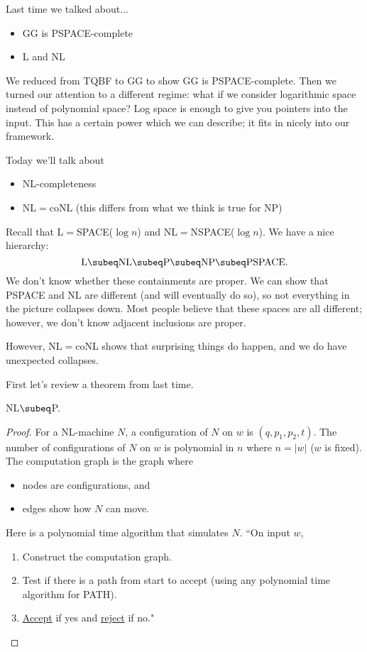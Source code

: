 
Last time we talked about...
\begin{itemize}
\item
GG is PSPACE-complete
\item
L and NL
\end{itemize}
We reduced from TQBF to GG to show GG is PSPACE-complete. Then we turned our attention to a different regime: what if we consider logarithmic space instead of polynomial space? Log space is enough to give you pointers into the input. This has a certain power which we can describe; it fits in nicely into our framework.

Today we'll talk about
\begin{itemize}
\item
NL-completeness %
\item
NL$=$coNL (this differs from what we think is true for NP) %
\end{itemize}

Recall that L$=$SPACE($\log n$) and NL$=$NSPACE($\log n$). We have a nice hierarchy:
\[
\text{L}\subeq \text{NL}\subeq \text{P}\subeq \text{NP}\subeq \text{PSPACE}.
\]
We don't know whether these containments are proper. We can show that PSPACE and NL are different (and will eventually do so), so not everything in the picture collapses down. Most people believe that these spaces are all different; however, we don't know adjacent inclusions are proper.

However, NL$=$coNL shows that surprising things do happen, and we do have unexpected collapses.

First let's review a theorem from last time.
\begin{thm*}
NL$\subeq $P.
\end{thm*}
\begin{proof}%
For a NL-machine $N$, a configuration of $N$ on $w$ is $(q,p_1,p_2,t)$. The number of configurations of $N$ on $w$ is polynomial in $n$ where $n=|w|$ ($w$ is fixed). %
The computation graph is the graph where 
\begin{itemize}
\item
nodes are configurations, and
\item
edges show how $N$ can move.
\end{itemize}

Here is a polynomial time algorithm that simulates $N$. ``On input $w$, 
\begin{enumerate}
\item
Construct the computation graph.
\item
Test if there is a path from start to accept (using any polynomial time algorithm for PATH).
\item
\ul{Accept} if yes and \ul{reject} if no."
\end{enumerate}
\end{proof}
